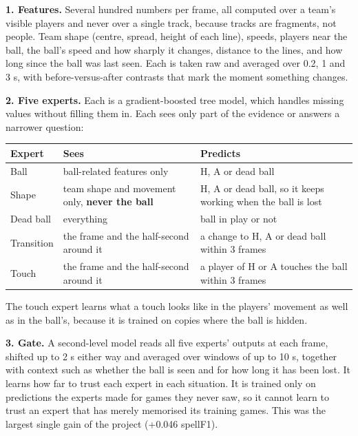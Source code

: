 \documentclass[10pt,a4paper]{article}
\begin{document}
\textbf{1. Features.} Several hundred numbers per frame, all computed over a team's visible players and
never over a single track, because tracks are fragments, not people. Team shape (centre, spread,
height of each line), speeds, players near the ball, the ball's speed and how sharply it changes,
distance to the lines, and how long since the ball was last seen. Each is taken raw and averaged
over 0.2, 1 and 3 s, with before-versus-after contrasts that mark the moment something changes.


\textbf{2. Five experts.} Each is a gradient-boosted tree model, which handles missing values without
filling them in. Each sees only part of the evidence or answers a narrower question:


{\footnotesize
\begin{longtable}{>{\raggedright\arraybackslash}p{}>{\raggedright\arraybackslash}p{}>{\raggedright\arraybackslash}p{}}
\toprule
{}\textbf{Expert} & {}\textbf{Sees} & {}\textbf{Predicts} \\
\midrule
\endhead
{}Ball & {}ball-related features only & {}H, A or dead ball \\
\addlinespace[3pt]
{}Shape & {}team shape and movement only, \textbf{never the ball} & {}H, A or dead ball, so it keeps working when the ball is lost \\
\addlinespace[3pt]
{}Dead ball & {}everything & {}ball in play or not \\
\addlinespace[3pt]
{}Transition & {}the frame and the half-second around it & {}a change to H, A or dead ball within 3 frames \\
\addlinespace[3pt]
{}Touch & {}the frame and the half-second around it & {}a player of H or A touches the ball within 3 frames \\
\bottomrule
\end{longtable}
}


The touch expert learns what a touch looks like in the players' movement as well as in the
ball's, because it is trained on copies where the ball is hidden.


\textbf{3. Gate.} A second-level model reads all five experts' outputs at each frame, shifted up to
2 s either way and averaged over windows of up to 10 s, together with context such as whether the
ball is seen and for how long it has been lost. It learns how far to trust each expert in each
situation. It is trained only on predictions the experts made for games they never saw, so it
cannot learn to trust an expert that has merely memorised its training games. This was the
largest single gain of the project (+0.046 spellF1).
\end{document}
